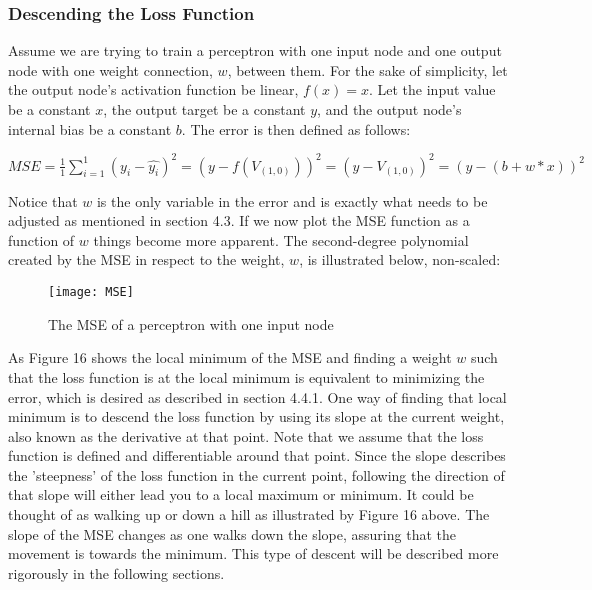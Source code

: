 \documentclass[titlepage]{article}
\begin{document}
\newpage

\subsubsection{Descending the Loss Function}

\vskip 0.2cm

Assume we are trying to train a perceptron with one input node and one output node with one weight connection, $w$, between them. For the sake of simplicity, let the output node's activation function be linear, $f(x) = x$. Let the input value be a constant $x$, the output target be a constant $y$, and the output node's internal bias be a constant $b$. The error is then defined as follows: 

\vskip 0.5cm

\centerline{$MSE = \frac{1}{1}\sum_{i=1}^{1}(y_{i} - \hat{y_{i}})^2 = (y - f(V_{(1, 0)}))^2 = (y - V_{(1, 0)})^2 = (y - (b + w * x))^2$}

\vskip 0.5cm

\noindent
Notice that $w$ is the only variable in the error and is exactly what needs to be adjusted as mentioned in section 4.3. If we now plot the MSE function as a function of $w$ things become more apparent. The second-degree polynomial created by the MSE in respect to the weight, $w$, is illustrated below, non-scaled:

\vskip 0.5cm

\begin{figure}[h]
    \center
    \texttt{[image: MSE]}
    \caption{The MSE of a perceptron with one input node}
\end{figure}

\vskip 0.2cm

\noindent
As Figure 16 shows the local minimum of the MSE and finding a weight $w$ such that the loss function is at the local minimum is equivalent to minimizing the error, which is desired as described in section 4.4.1. One way of finding that local minimum is to descend the loss function by using its slope at the current weight, also known as the derivative at that point. Note that we assume that the loss function is defined and differentiable around that point. Since the slope describes the 'steepness' of the loss function in the current point, following the direction of that slope will either lead you to a local maximum or minimum. It could be thought of as walking up or down a hill as illustrated by Figure 16 above. The slope of the MSE changes as one walks down the slope, assuring that the movement is towards the minimum. This type of descent will be described more rigorously in the following sections.
\end{document}

